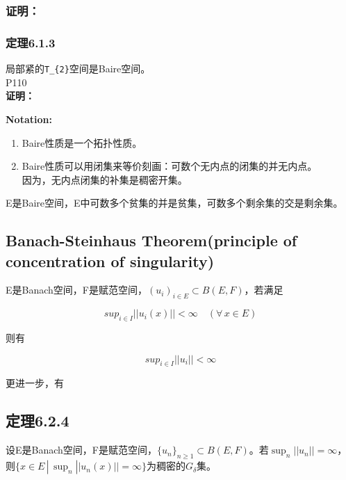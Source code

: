 \documentclass[
]{article}
\begin{document}
\hypertarget{ux8bc1ux660e-1}{%
\subsubsection{\texorpdfstring{\textbf{证明：}}{证明：}}\label{ux8bc1ux660e-1}}

\hypertarget{ux5b9aux7406613}{%
\subsubsection{\texorpdfstring{\textbf{定理6.1.3}
}{定理6.1.3 }}\label{ux5b9aux7406613}}

局部紧的\texttt{T\_\{2\}}空间是Baire空间。\\
P110\\
\textbf{证明：}

\textbf{Notation:}

\begin{enumerate}
\def\labelenumi{\arabic{enumi}.}
\item
  Baire性质是一个拓扑性质。
\item
  Baire性质可以用闭集来等价刻画：可数个无内点的闭集的并无内点。\\
  因为，无内点闭集的补集是稠密开集。
\end{enumerate}

E是Baire空间，E中可数多个贫集的并是贫集，可数多个剩余集的交是剩余集。

\hypertarget{banach-steinhaus-theoremprinciple-of-concentration-of-singularity}{%
\subsection{Banach-Steinhaus Theorem(principle of concentration of
singularity)}\label{banach-steinhaus-theoremprinciple-of-concentration-of-singularity}}

E是Banach空间，F是赋范空间，\((u_{i})_{i \in E} \subset B(E,F)\)，若满足

\[sup_{i \in I}||u_{i}(x)||<\infty \quad (\forall \, x \in E)\]

则有

\[sup_{i \in I}||u_{i}|| < \infty\]

更进一步，有

\hypertarget{ux5b9aux7406624}{%
\subsection{\texorpdfstring{\textbf{定理6.2.4}}{定理6.2.4}}\label{ux5b9aux7406624}}

设E是Banach空间，F是赋范空间，\(\{u_{n}\}_{n\geq 1}\subset B(E,F)\)。若\(\sup_{n}||u_{n}|| = \infty\)，则\(\{x\in E\, |\, \sup_{n}||u_{n}(x)||=\infty\}\)为稠密的\(G_{\delta}\)集。
\end{document}
